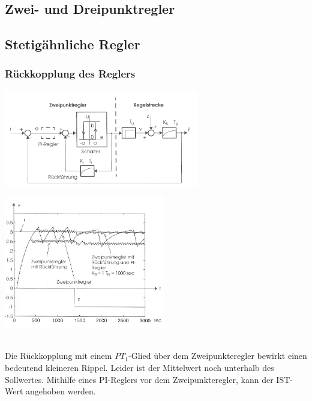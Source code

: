 	\subsection{Zwei- und Dreipunktregler}
	\subsection{Stetigähnliche Regler}
		\subsubsection{Rückkopplung des Reglers}
		\begin{minipage}{9cm}
		\includegraphics[width=8.5cm]{./bilder/ZweipunktreglerMitRueckfuehrung.jpg}
        \end{minipage}
		\begin{minipage}{7.5cm}
        \includegraphics[width=7cm]{./bilder/ZweipunktreglerMitRueckfuehrung_dia.jpg}
        \end{minipage}\\
		Die Rückkopplung mit einem $PT_1$-Glied über dem Zweipunkteregler bewirkt
		einen bedeutend kleineren Rippel. Leider ist der Mittelwert noch unterhalb des
		Sollwertes. Mithilfe eines PI-Reglers vor dem Zweipunkteregler, kann der IST-Wert
		angehoben werden.

